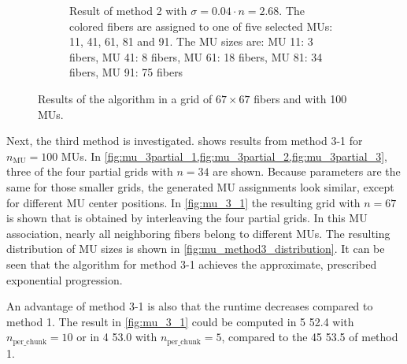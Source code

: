 \begin{figure}
\begin{subfigure}[t]{0.48\textwidth}
    \caption{Result of method 2 with $\sigma = 0.04\cdot n = \num{2.68}$. The colored fibers are assigned to one of five selected MUs: 11, 41, 61, 81 and 91. The MU sizes are:  
    MU 11: 3 fibers, MU 41: 8 fibers, MU 61: 18 fibers, MU 81: 34 fibers, MU 91: 75 fibers}%
    \label{fig:MU_fibre_distribution_sparse2_67x67_100_2d_fiber_distribution}%
  \end{subfigure}
  \caption{Results of the algorithm in a grid of $67 \times 67$ fibers and with 100 MUs.}%
  \label{fig:100mus_results}%
\end{figure}%




Next, the third method is investigated.
 shows results from method 3-1 for $n_\text{MU}=100$ MUs. In \cref{fig:mu_3partial_1,fig:mu_3partial_2,fig:mu_3partial_3}, three of the four partial grids with $n=34$ are shown. 
Because parameters are the same for those smaller grids, the generated MU assignments look similar, except for different MU center positions. In \cref{fig:mu_3_1} the resulting grid with $n=67$ is shown that is obtained by interleaving the four partial grids. In this MU association, nearly all neighboring fibers belong to different MUs. The resulting distribution of MU sizes is shown in \cref{fig:mu_method3_distribution}. It can be seen that the algorithm for method 3-1 achieves the approximate, prescribed exponential progression.

An advantage of method 3-1 is also that the runtime decreases compared to method 1. The result in \cref{fig:mu_3_1} could be computed in \SI{5}{\min} \SI{52.4}{\sec} with $n_\text{per\_chunk}=10$ or in \SI{4}{\min} \SI{53.0}{\sec} with $n_\text{per\_chunk}=5$, compared to the \SI{45}{\min} \SI{53.5}{\sec} of method 1.

